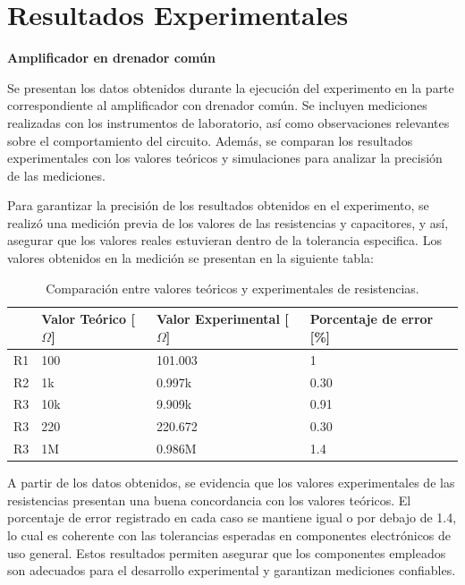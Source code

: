 \documentclass[journal]{IEEEtran}
\begin{document}
	\section{Resultados Experimentales}
	\textbf{Amplificador en drenador común}
	\par Se presentan los datos obtenidos durante la ejecución del experimento en la parte correspondiente al amplificador con drenador común. Se incluyen mediciones realizadas con los instrumentos de laboratorio, así como observaciones relevantes sobre el comportamiento del circuito. Además, se comparan los resultados experimentales con los valores teóricos y simulaciones para analizar la precisión de las mediciones.
	\par Para garantizar la precisión de los resultados obtenidos en el experimento, se realizó una medición previa de los valores de las resistencias y capacitores, y así, asegurar que los valores reales estuvieran dentro de la tolerancia especifica. Los valores obtenidos en la medición se presentan en la siguiente tabla:
	\begin{table}[h]
		\caption{Comparación entre valores teóricos y experimentales de resistencias.}
		\centering
		\renewcommand{\arraystretch}{1.2} %
		\begin{tabular}{|l|p{2cm}|p{2cm}|p{2cm}|}
			\hline
			& \textbf{Valor Teórico [$\Omega$]} & \textbf{Valor Experimental [$\Omega$]} & \textbf{Porcentaje de error [\%]} \\
			\hline
			R1 & 100  & 101.003  & 1 \\
			\hline
			R2 & 1k   & 0.997k  & 0.30 \\
			\hline
			R3 & 10k & 9.909k & 0.91 \\
			\hline
			R3 & 220 & 220.672 & 0.30 \\
			\hline
			R3 & 1M & 0.986M & 1.4 \\
			\hline
		\end{tabular}
		\label{tab:resistencias}
	\end{table}
	\par A partir de los datos obtenidos, se evidencia que los valores experimentales de las resistencias presentan una buena concordancia con los valores teóricos. El porcentaje de error registrado en cada caso se mantiene igual o por debajo de 1.4, lo cual es coherente con las tolerancias esperadas en componentes electrónicos de uso general. Estos resultados permiten asegurar que los componentes empleados son adecuados para el desarrollo experimental y garantizan mediciones confiables.
\end{document}
